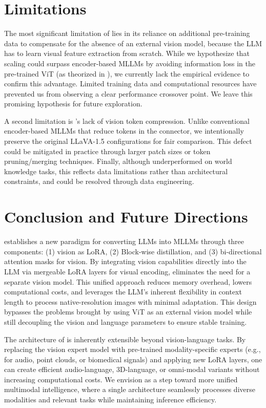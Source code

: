 \section{Limitations}
\label{sec:limitations}

The most significant limitation of \model{} lies in its reliance on additional pre-training data to compensate for the absence of an external vision model, because the LLM has to learn visual feature extraction from scratch.
While we hypothesize that scaling \model{} could surpass encoder-based MLLMs by avoiding information loss in the pre-trained ViT (as theorized in \cite{eve, cambrian1}), we currently lack the empirical evidence to confirm this advantage. Limited training data and computational resources have prevented us from observing a clear performance crossover point. We leave this promising hypothesis for future exploration.

A second limitation is \model{}'s lack of vision token compression. Unlike conventional encoder-based MLLMs that reduce tokens in the connector, we intentionally preserve the original LLaVA-1.5 configurations for fair comparison. This defect could be mitigated in practice through larger patch sizes \cite{eve, evev2, monointernvl} or token pruning/merging techniques. Finally, although \model{} underperformed on world knowledge tasks, this reflects data limitations rather than architectural constraints, and could be resolved through data engineering.

\section{Conclusion and Future Directions}
\label{sec:conclusion}

\model{} establishes a new paradigm for converting LLMs into MLLMs through three components: (1) vision as LoRA, (2) Block-wise distillation, and (3) bi-directional attention masks for vision. 
By integrating vision capabilities directly into the LLM via mergeable LoRA layers for visual encoding, \model{} eliminates the need for a separate vision model. This unified approach reduces memory overhead, lowers computational costs, and leverages the LLM’s inherent flexibility in context length to process native-resolution images with minimal adaptation. This design bypasses the problems brought by using ViT as an external vision model while still decoupling the vision and language parameters to ensure stable training.

The architecture of \model{} is inherently extensible beyond vision-language tasks. By replacing the vision expert model with pre-trained modality-specific experts (e.g., for audio, point clouds, or biomedical signals) and applying new LoRA layers, one can create efficient audio-language, 3D-language, or omni-modal variants without increasing computational costs. 
We envision \model{} as a step toward more unified multimodal intelligence, where a single architecture seamlessly processes diverse modalities and relevant tasks while maintaining inference efficiency.

